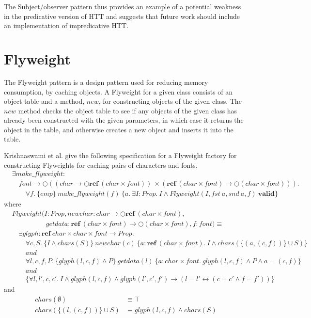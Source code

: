 \documentclass[a4paper,english]{article}
\newcommand{\PROP}[0]{Prop}
\newcommand{\MONAD}[0]{\bigcirc}
\newcommand{\AND}[0]{and}
\newcommand{\REF}[0]{\mathbf{ref}}
\newcommand{\VALID}[0]{\mathbf{valid}}
\begin{document}
The Subject/observer pattern thus provides an example of a potential weakness
in the predicative version of HTT and suggests that future work should include
an implementation of impredicative HTT. 

\section{Flyweight}

The Flyweight pattern is a design pattern used for reducing memory consumption,
by caching objects. A Flyweight for a given class consists of an object table
and a method, $new$, for constructing objects of the given class. The $new$
method checks the object table to see if any objects of the given class has
already been constructed with the given parameters, in which case it returns
the object in the table, and otherwise creates a new object and inserts it into
the table. 

Krishnaswami et al. give the following specification for a Flyweight factory
for constructing Flyweights for caching pairs of characters and fonts. 
\begin{align*}
&\exists make\_flyweight:\\
&\quad font \rightarrow \MONAD ((char \rightarrow \MONAD \REF\ (char \times font))\ \times (\REF\ (char \times font) \rightarrow \MONAD (char \times font))).\\
&\quad\quad \forall f.\ \{ emp \}\ make\_flyweight(f)\ \{ a.\ \exists I : \PROP.\ I \land Flyweight(I, fst\ a, snd\ a, f)\ \VALID \}
\end{align*}
where
\begin{align*}
&Flyweight(I : \PROP, newchar : char \rightarrow \MONAD \REF\ (char \times font),\\
&\quad\quad\quad\quad\quad getdata : \REF\ (char \times font) \rightarrow \MONAD(char \times font), f : font) \equiv\\
&\quad\exists glyph : \REF\ char \times char \times font \rightarrow \PROP.\\
&\quad\quad\forall c, S.\ \{ I \land chars(S) \}\ newchar(c)\ \{ a : \REF\ (char \times font).\ I \land chars(\{(a, (c, f))\} \cup S) \}\\
&\quad\quad\AND\\
&\quad\quad\forall l, c, f, P.\ \{ glyph(l, c, f) \land P \}\ getdata(l)\ \{ a : char \times font.\ glyph(l, c, f) \land P \land a = (c, f) \}\\
&\quad\quad\AND\\
&\quad\quad\{ \forall l, l', c, c'.\ I \land glyph(l, c, f) \land glyph(l', c', f') \rightarrow (l = l' \leftrightarrow (c = c' \land f = f')) \}
\end{align*}
and
\begin{align*}
chars(\emptyset) &\equiv \top\\
chars(\{ (l, (c, f)) \} \cup S) &\equiv glyph(l, c, f) \land chars(S)
\end{align*}
\end{document}
